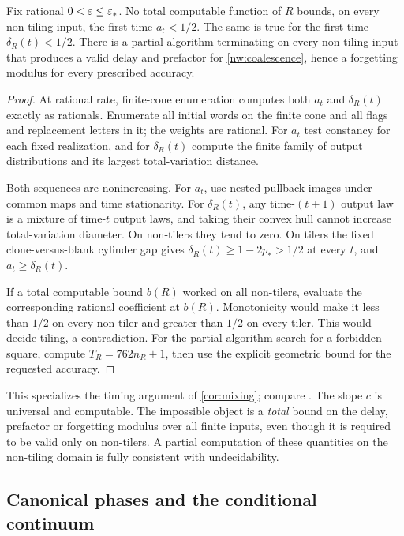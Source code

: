 \begin{corollary}\label{nw:times}
Fix rational $0<\varepsilon\le\varepsilon_*$. No total computable function of $R$ bounds, on every non-tiling input, the first time $a_t<1/2$. The same is true for the first time $\delta_R(t)<1/2$. There is a partial algorithm terminating on every non-tiling input that produces a valid delay and prefactor for \eqref{nw:coalescence}, hence a forgetting modulus for every prescribed accuracy.
\end{corollary}
\begin{proof}
At rational rate, finite-cone enumeration computes both $a_t$ and $\delta_R(t)$ exactly as rationals. Enumerate all initial words on the finite cone and all flags and replacement letters in it; the weights are rational. For $a_t$ test constancy for each fixed realization, and for $\delta_R(t)$ compute the finite family of output distributions and its largest total-variation distance.

Both sequences are nonincreasing. For $a_t$, use nested pullback images under common maps and time stationarity. For $\delta_R(t)$, any time-$(t+1)$ output law is a mixture of time-$t$ output laws, and taking their convex hull cannot increase total-variation diameter. On non-tilers they tend to zero. On tilers the fixed clone-versus-blank cylinder gap gives $\delta_R(t)\ge1-2p_*>1/2$ at every $t$, and $a_t\ge\delta_R(t)$.

If a total computable bound $b(R)$ worked on all non-tilers, evaluate the corresponding rational coefficient at $b(R)$. Monotonicity would make it less than $1/2$ on every non-tiler and greater than $1/2$ on every tiler. This would decide tiling, a contradiction. For the partial algorithm search for a forbidden square, compute $T_R=762n_R+1$, then use the explicit geometric bound for the requested accuracy.
\end{proof}

This specializes the timing argument of \cref{cor:mixing}; compare \cite[Corollaries~9.10--9.11]{DMdiagram}. The slope $c$ is universal and computable. The impossible object is a \emph{total} bound on the delay, prefactor or forgetting modulus over all finite inputs, even though it is required to be valid only on non-tilers. A partial computation of these quantities on the non-tiling domain is fully consistent with undecidability.

\subsection{Canonical phases and the conditional continuum}

